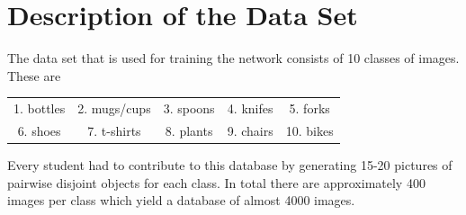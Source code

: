 \documentclass{tubaf-article}
\begin{document}
	\section{Description of the Data Set}
	\label{dataset}
	The data set that is used for training the network consists of 10 classes of images. These are
	\begin{center}
		\begin{tabular}{ c c c c c }
			1. bottles & 2. mugs/cups & 3. spoons & 4. knifes & 5. forks \\ 
			6. shoes & 7. t-shirts & 8. plants & 9. chairs & 10. bikes    
		\end{tabular}
	\end{center}
	Every student had to contribute to this database by generating 15-20 pictures of pairwise disjoint objects for each class. In total there are approximately 400 images per class which yield a database of almost 4000 images. 
\end{document}

